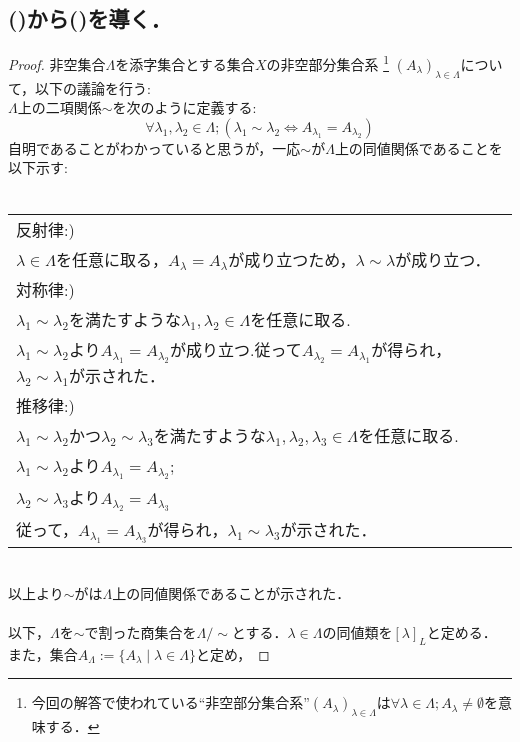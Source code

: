 \documentclass{jarticle}
\begin{document}
\subsection{()から()を導く．}
\begin{proof}
非空集合$\Lambda$を添字集合とする集合$X$の非空部分集合系 \footnote{今回の解答で使われている“非空部分集合系”$(A_\lambda)_{\lambda \in \Lambda}$は$\forall \lambda \in \Lambda ; A_\lambda \neq\emptyset$を意味する．}
	$(A_\lambda)_{\lambda \in \Lambda}$について，以下の議論を行う:\\ 
$\Lambda$上の二項関係$\sim$を次のように定義する:\\
$$
	\forall \lambda_1,\lambda_2 \in \Lambda;( \lambda_1 \sim \lambda_2 \iff A_{\lambda_1} = A_{\lambda_2})
$$
自明であることがわかっていると思うが，一応$\sim$が$\Lambda$上の同値関係であることを以下示す:\\
\\
	\begin{tabular}{|p{11cm}|}
\hline
	反射律:)\\
	$\lambda \in \Lambda$を任意に取る，$A_{\lambda} = A_{\lambda}$が成り立つため，$\lambda \sim \lambda$が成り立つ．\\
	\hline
	対称律:)\\
$\lambda_1 \sim \lambda_2$を満たすような$\lambda_1 ,\lambda_2 \in \Lambda$を任意に取る.\\
$\lambda_1 \sim \lambda_2$より$A_{\lambda_1} = A_{\lambda_2}$が成り立つ.従って$A_{\lambda_2} = A_{\lambda_1}$が得られ，
$\lambda_2 \sim \lambda_1$が示された．\\
\hline
	推移律:)\\
$\lambda_1 \sim \lambda_2$かつ$\lambda_2 \sim \lambda_3$を満たすような$\lambda_1 ,\lambda_2 , \lambda_3 \in \Lambda$を任意に取る.\\
$\lambda_1 \sim \lambda_2$より$A_{\lambda_1} = A_{\lambda_2}$;\\
$\lambda_2 \sim \lambda_3$より$A_{\lambda_2} = A_{\lambda_3}$\\
	従って，$A_{\lambda_1} = A_{\lambda_3}$が得られ，$\lambda_1 \sim \lambda_3$が示された．\\
\hline
	\end{tabular}
\\
	以上より$\sim$がは$\Lambda$上の同値関係であることが示された．\\
	\\
以下，$\Lambda$を$\sim$で割った商集合を$\Lambda / \! \sim$とする．$\lambda \in \Lambda$の同値類を$[\lambda]_{L}$と定める．
	また，集合$A_{\Lambda}:= \{A_\lambda \mid \lambda \in \Lambda \}$と定め，

\end{proof}
\end{document}
